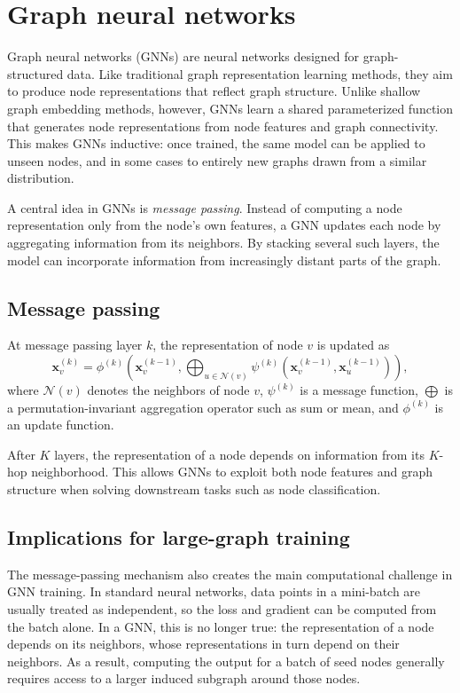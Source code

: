 \documentclass[PhD,single]{uclathes}
\begin{document}
\section{Graph neural networks}
Graph neural networks (GNNs) are neural networks designed for graph-structured
data. Like traditional graph representation learning methods, they aim to
produce node representations that reflect graph structure. Unlike shallow graph
embedding methods, however, GNNs learn a shared parameterized function that
generates node representations from node features and graph connectivity. This
makes GNNs inductive: once trained, the same model can be applied to unseen
nodes, and in some cases to entirely new graphs drawn from a similar
distribution.

A central idea in GNNs is \emph{message passing}. Instead of computing a node
representation only from the node's own features, a GNN updates each node by
aggregating information from its neighbors. By stacking several such layers, the
model can incorporate information from increasingly distant parts of the graph.

\subsection{Message passing}
At message passing layer $k$, the representation of node $v$ is updated as
\[
\mathbf{x}_v^{(k)} =
\phi^{(k)}\!\left(
\mathbf{x}_v^{(k-1)},
\bigoplus_{u \in \mathcal{N}(v)}
\psi^{(k)}\!\left(\mathbf{x}_v^{(k-1)}, \mathbf{x}_u^{(k-1)}\right)
\right),
\]
where $\mathcal{N}(v)$ denotes the neighbors of node $v$, $\psi^{(k)}$ is a
message function, $\bigoplus$ is a permutation-invariant aggregation operator
such as sum or mean, and $\phi^{(k)}$ is an update function.

After $K$ layers, the representation of a node depends on information from its
$K$-hop neighborhood. This allows GNNs to exploit both node features and graph
structure when solving downstream tasks such as node classification.

\subsection{Implications for large-graph training}
The message-passing mechanism also creates the main computational challenge in
GNN training. In standard neural networks, data points in a mini-batch are
usually treated as independent, so the loss and gradient can be computed from
the batch alone. In a GNN, this is no longer true: the representation of a node
depends on its neighbors, whose representations in turn depend on their
neighbors. As a result, computing the output for a batch of seed nodes
generally requires access to a larger induced subgraph around those nodes.
\end{document}
